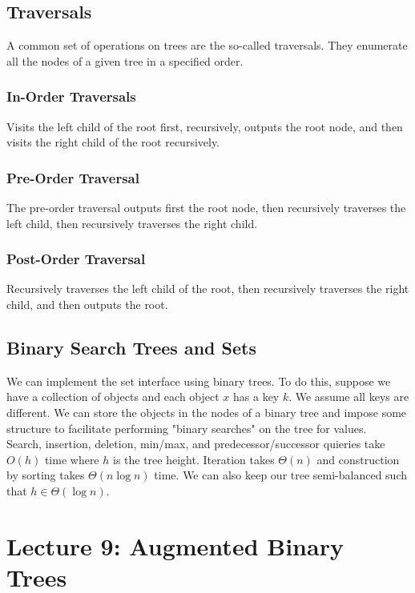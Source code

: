 \documentclass[11pt]{article}
\begin{document}
\subsection{Traversals}
A common set of operations on trees are the so-called traversals. They enumerate all the nodes of a
given tree in a specified order.

\subsubsection{In-Order Traversals}
Visits the left child of the root first, recursively, outputs the root node, and then visits
the right child of the root recursively.

\subsubsection{Pre-Order Traversal}
The pre-order traversal outputs first the root node, then recursively traverses the left child, then
recursively traverses the right child.

\subsubsection{Post-Order Traversal}
Recursively traverses the left child of the root, then recursively traverses the right child, and
then outputs the root.

\subsection{Binary Search Trees and Sets}
We can implement the set interface using binary trees. To do this, suppose we have a collection of
objects and each object $x$ has a key $k$. We assume all keys are different. We can store the
objects in the nodes of a binary tree and impose some structure to facilitate performing
"binary searches" on the tree for values. \\
Search, insertion, deletion, min/max, and predecessor/successor quieries take $O(h)$ time where $h$
is the tree height. Iteration takes $\Theta(n)$ and construction by sorting takes $\Theta(n\log n)$
time. We can also keep our tree semi-balanced such that $h \in \Theta(\log n)$.


\section{Lecture 9: Augmented Binary Trees}
\end{document}

